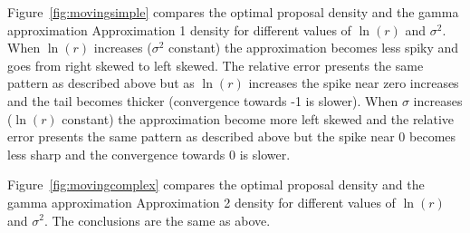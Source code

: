 \documentclass{article}
\begin{document}
Figure~\ref{fig:movingsimple} compares the optimal proposal density and the gamma approximation Approximation 1 density for different values of $\ln(r)$ and $\sigma^2$. When $\ln(r)$ increases ($\sigma^2$ constant) the approximation becomes less spiky and goes from right skewed to left skewed. The relative error presents the same pattern as described above but as $\ln(r)$ increases the spike near zero increases and the tail becomes thicker (convergence towards -1 is slower). When $\sigma$ increases ($\ln(r)$ constant) the approximation become more left skewed and the relative error presents the same pattern as described above but the spike near 0 becomes less sharp and the convergence towards 0 is slower.

Figure~\ref{fig:movingcomplex} compares the optimal proposal density and the gamma approximation Approximation 2 density for different values of $\ln(r)$ and $\sigma^2$. The conclusions are the same as above.
\end{document}
